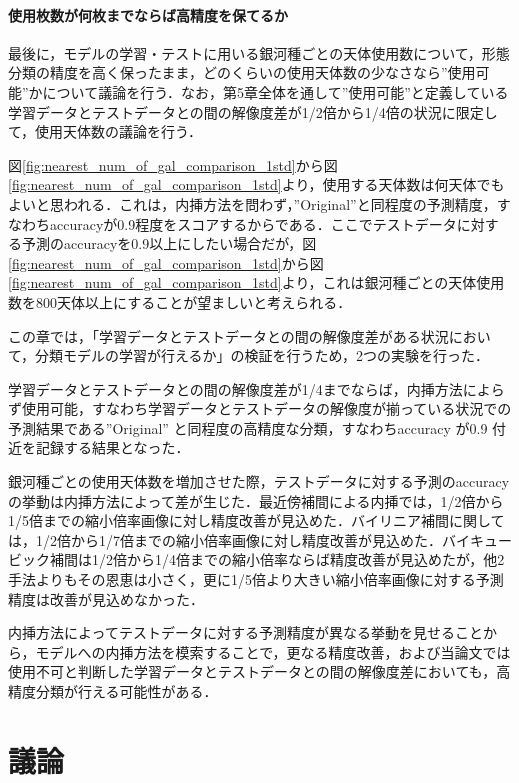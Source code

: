 \documentclass[a4j, 11pt]{jreport}
\begin{document}
\subsubsection{使用枚数が何枚までならば高精度を保てるか}
最後に，モデルの学習・テストに用いる銀河種ごとの天体使用数について，形態分類の精度を高く保ったまま，どのくらいの使用天体数の少なさなら''使用可能''かについて議論を行う．なお，第5章全体を通して''使用可能''と定義している学習データとテストデータとの間の解像度差が1/2倍から1/4倍の状況に限定して，使用天体数の議論を行う．

図\ref{fig:nearest_num_of_gal_comparison_1std}から図\ref{fig:nearest_num_of_gal_comparison_1std}より，使用する天体数は何天体でもよいと思われる．これは，内挿方法を問わず，''Original''と同程度の予測精度，すなわちaccuracyが0.9程度をスコアするからである．ここでテストデータに対する予測のaccuracyを0.9以上にしたい場合だが，図\ref{fig:nearest_num_of_gal_comparison_1std}から図\ref{fig:nearest_num_of_gal_comparison_1std}より，これは銀河種ごとの天体使用数を800天体以上にすることが望ましいと考えられる．

この章では，「学習データとテストデータとの間の解像度差がある状況において，分類モデルの学習が行えるか」の検証を行うため，2つの実験を行った．

学習データとテストデータとの間の解像度差が1/4までならば，内挿方法によらず使用可能，すなわち学習データとテストデータの解像度が揃っている状況での予測結果である”Original” と同程度の高精度な分類，すなわちaccuracy が0.9 付近を記録する結果となった．

銀河種ごとの使用天体数を増加させた際，テストデータに対する予測のaccuracyの挙動は内挿方法によって差が生じた．最近傍補間による内挿では，1/2倍から1/5倍までの縮小倍率画像に対し精度改善が見込めた．バイリニア補間に関しては，1/2倍から1/7倍までの縮小倍率画像に対し精度改善が見込めた．バイキュービック補間は1/2倍から1/4倍までの縮小倍率ならば精度改善が見込めたが，他2手法よりもその恩恵は小さく，更に1/5倍より大きい縮小倍率画像に対する予測精度は改善が見込めなかった．

内挿方法によってテストデータに対する予測精度が異なる挙動を見せることから，モデルへの内挿方法を模索することで，更なる精度改善，および当論文では使用不可と判断した学習データとテストデータとの間の解像度差においても，高精度分類が行える可能性がある．

\newpage
\chapter{議論}
\end{document}
